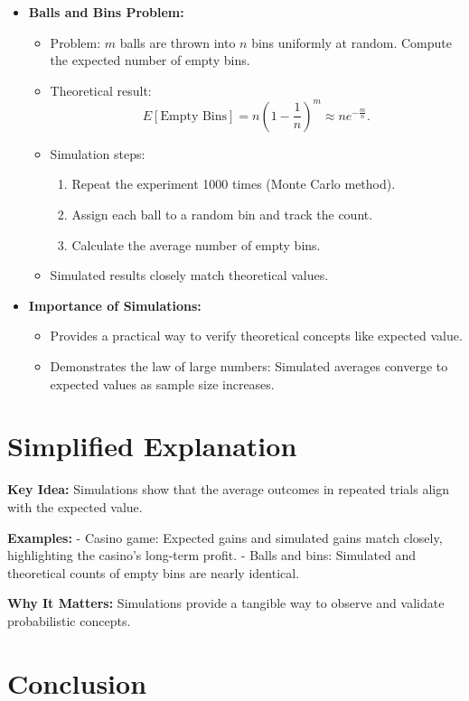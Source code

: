 \documentclass{article}
\begin{document}
\begin{itemize}
  \item \textbf{Balls and Bins Problem:}
    \begin{itemize}
      \item Problem: $m$ balls are thrown into $n$ bins uniformly at random. Compute the expected number of empty bins.
      \item Theoretical result:
        \[
          E[\text{Empty Bins}] = n \left(1 - \frac{1}{n}\right)^m \approx n e^{-\frac{m}{n}}.
        \]
      \item Simulation steps:
        \begin{enumerate}
          \item Repeat the experiment 1000 times (Monte Carlo method).
          \item Assign each ball to a random bin and track the count.
          \item Calculate the average number of empty bins.
        \end{enumerate}
      \item Simulated results closely match theoretical values.
    \end{itemize}

  \item \textbf{Importance of Simulations:}
    \begin{itemize}
      \item Provides a practical way to verify theoretical concepts like expected value.
      \item Demonstrates the law of large numbers: Simulated averages converge to expected values as sample size increases.
    \end{itemize}
\end{itemize}

\section*{Simplified Explanation}

\textbf{Key Idea:}
Simulations show that the average outcomes in repeated trials align with the expected value.

\textbf{Examples:}
- Casino game: Expected gains and simulated gains match closely, highlighting the casino's long-term profit.
- Balls and bins: Simulated and theoretical counts of empty bins are nearly identical.

\textbf{Why It Matters:}
Simulations provide a tangible way to observe and validate probabilistic concepts.

\section*{Conclusion}
\end{document}
